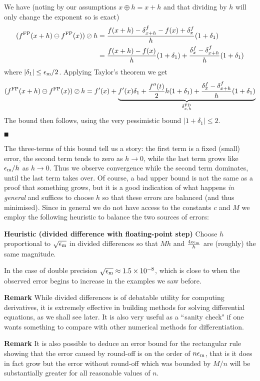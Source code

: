 We have (noting by our assumptions $x \ensuremath{\oplus} h = x + h$ and that dividing by $h$ will only change the exponent so is exact)
\begin{align*}
(f^{\rm FP}(x + h) \ensuremath{\ominus} f^{\rm FP}(x)) \ensuremath{\oslash} h &= {f(x + h) -  \ensuremath{\delta}^f_{x+h} - f(x) + \ensuremath{\delta}^f_x \over h} (1 + \ensuremath{\delta}_1) \\
&= {f(x+h) - f(x) \over h} (1 + \ensuremath{\delta}_1) + { \ensuremath{\delta}^f_x - \ensuremath{\delta}^f_{x+h} \over h} (1 + \ensuremath{\delta}_1)
\end{align*}
where $|\ensuremath{\delta}_1| \ensuremath{\leq} {\ensuremath{\epsilon}_{\rm m} / 2}$. Applying Taylor's theorem we get
\[
(f^{\rm FP}(x + h) \ensuremath{\ominus} f^{\rm FP}(x)) \ensuremath{\oslash} h = f'(x) + \underbrace{f'(x) \ensuremath{\delta}_1 + {f''(t) \over 2} h (1 + \delta_1) + {\ensuremath{\delta}^f_x  - \ensuremath{\delta}^f_{x+h}\over h} (1 + \ensuremath{\delta}_1)}_{\ensuremath{\delta}_{x,h}^{\rm FD}}
\]
The bound then follows, using the very pessimistic bound $|1 + \ensuremath{\delta}_1| \ensuremath{\leq} 2$.

\ensuremath{\QED}

The three-terms of this bound tell us a story: the first term is a fixed (small) error, the second term tends to zero as $h \rightarrow 0$, while the last term grows like $\ensuremath{\epsilon}_{\rm m}/h$ as $h \rightarrow 0$.  Thus we observe convergence while the second term dominates, until the last term takes over. Of course, a bad upper bound is not the same as a proof that something grows, but it is a good indication of what happens \emph{in general} and suffices to choose $h$ so that these errors are balanced (and thus minimised). Since in general we do not have access to the constants $c$ and $M$ we employ the following heuristic to balance the two sources of errors:

\textbf{Heuristic (divided difference with floating-point step)} Choose $h$ proportional to $\sqrt{\ensuremath{\epsilon}_{\rm m}}$ in divided differences  so that $M h$ and ${4c \ensuremath{\epsilon}_{\rm m} \over h}$ are (roughly) the same magnitude.

In the case of double precision $\sqrt{\ensuremath{\epsilon}_{\rm m}} \ensuremath{\approx} 1.5\ensuremath{\times} 10^{-8}$, which is close to when the observed error begins to increase in the examples we saw before.

\textbf{Remark} While divided differences is of debatable utility for computing derivatives, it is extremely effective in building methods for solving differential equations, as we shall see later. It is also very useful as a \ensuremath{\ldq}sanity check" if one wants something to compare with other numerical methods for differentiation.

\textbf{Remark} It is also possible to deduce an error bound for the rectangular rule showing that the error caused by round-off is on the order of $n \ensuremath{\epsilon}_{\rm m}$, that is it does in fact grow but the error without round-off which was bounded by $M/n$ will be substantially greater for all reasonable values of $n$.



